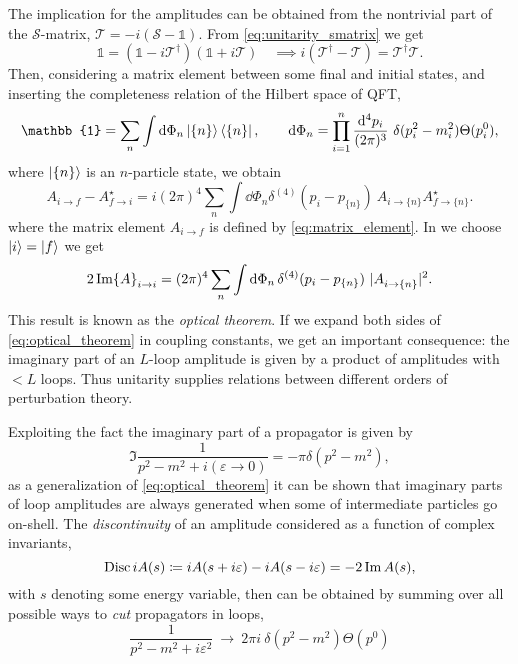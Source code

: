 The implication for the amplitudes can be obtained from the nontrivial part 
of the $\mathcal{S}$-matrix, $\mathcal{T} = -i(\mathcal{S}-\mathbb{1})$.
From \cref{eq:unitarity_smatrix} we get
\begin{equation}
  \mathbb{1} = (\mathbb{1}-i\mathcal{T}^\dagger)(\mathbb{1}+i\mathcal{T}) \quad\implies i(\mathcal{T}^\dagger- \mathcal{T}) = \mathcal{T}^\dagger\mathcal{T}.
\end{equation}
Then, considering a matrix element between some final and initial states,
and inserting the completeness relation of the Hilbert space of QFT,
\begin{equation}
  \mathbb{1} = \sum_n\int \dd{\Phi_n} \ket{\{n\}}\bra{\{n\}},    \qquad \dd{\Phi_n}=\prod_{i=1}^{n}\frac{\dd^4{p_i} }{(2\pi)^3} ~\delta(p_i^2-m_i^2) \Theta(p_i^{0}),
\end{equation}
where $\ket{\{n\}}$ is an $n$-particle state, we obtain
\begin{equation}
  A_{i\to f} - A_{f \to i}^\star = i (2\pi)^4 \sum_n \int \dd{\Phi_n} \delta^{(4)} (p_i - p_{\{n\}}) ~ A_{i \to \{n\}}^{\phantom{\star}} A^\star_{f \to \{n\}}.
\end{equation}
where the matrix element $A_{i \to f}$ is defined by \cref{eq:matrix_element}. 
In we choose $\ket{i} = \ket{f}$ we get 
\begin{equation} \label{eq:optical_theorem}
  2 \Im{A}_{i\to i} = (2\pi)^4 \sum_n \int \dd{\Phi_n} \delta^{(4)} (p_i - p_{\{n\}}) ~ \vert A_{i \to \{n\}}^{\phantom{\star}} \vert^2.
\end{equation}
This result is known as the \emph{optical theorem}. 
If we expand both sides of \cref{eq:optical_theorem} in coupling constants, we get an important
consequence: the imaginary part of an $L$-loop amplitude is given by a product of amplitudes with $< L$ loops.
Thus unitarity supplies relations between different orders of perturbation theory.

Exploiting the fact the imaginary part of a propagator is given by
\begin{equation}
  \Im\frac{1}{p^2-m^2+i(\varepsilon \to 0)} = -\pi\delta(p^2-m^2),
\end{equation}
as a generalization of \cref{eq:optical_theorem} it can be shown \cite{Eden:1966dnq,Cutkosky1960}
that imaginary parts of loop amplitudes are always generated when some of intermediate particles go on-shell.
The \emph{discontinuity} of an amplitude considered as a function of complex invariants,
\begin{equation}
  \operatorname{Disc} iA(s) \coloneqq iA(s+i\varepsilon)-iA(s-i\varepsilon) = -2\Im A(s),
\end{equation}
with $s$ denoting some energy variable,
then can be obtained \cite{Cutkosky1960} by summing over all possible ways to \emph{cut} propagators in loops,
\begin{equation} \label{eq:cut}
  \frac{1}{p^2-m^2+i\varepsilon^2} ~\longrightarrow~ 2\pi i ~\delta(p^2-m^2) \Theta(p^{0})
\end{equation}

